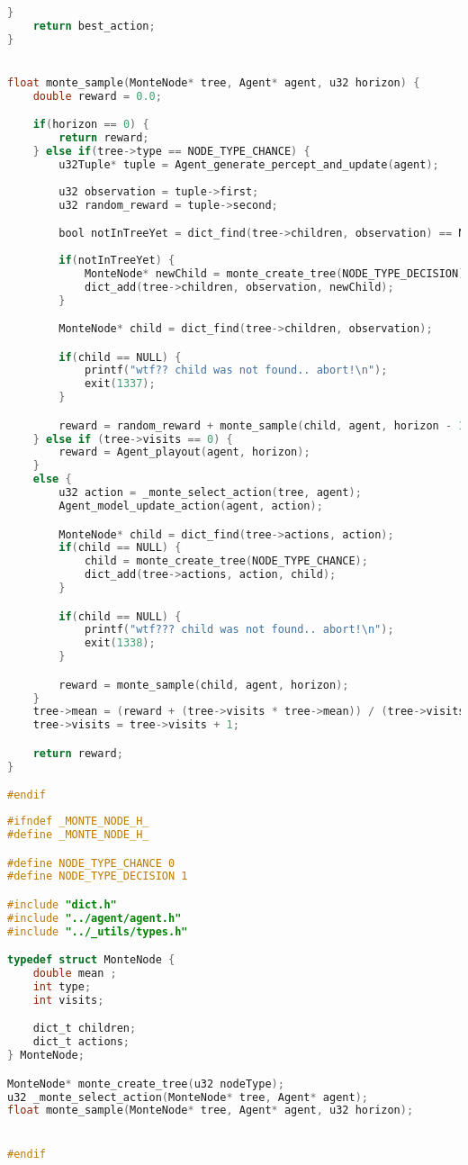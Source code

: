 \documentclass[fancychapters]{report}   	%
\begin{document}
\begin{lstlisting}[language=C,caption={search.c}]
    }
    return best_action;
}


float monte_sample(MonteNode* tree, Agent* agent, u32 horizon) {
    double reward = 0.0;

    if(horizon == 0) {
        return reward;
    } else if(tree->type == NODE_TYPE_CHANCE) {
        u32Tuple* tuple = Agent_generate_percept_and_update(agent);
	
        u32 observation = tuple->first;
        u32 random_reward = tuple->second;

        bool notInTreeYet = dict_find(tree->children, observation) == NULL;
	
        if(notInTreeYet) {
            MonteNode* newChild = monte_create_tree(NODE_TYPE_DECISION);
            dict_add(tree->children, observation, newChild);
        }

        MonteNode* child = dict_find(tree->children, observation);

        if(child == NULL) {
            printf("wtf?? child was not found.. abort!\n");
            exit(1337);
        }

        reward = random_reward + monte_sample(child, agent, horizon - 1);
    } else if (tree->visits == 0) {
        reward = Agent_playout(agent, horizon);
    }
    else {
        u32 action = _monte_select_action(tree, agent);
        Agent_model_update_action(agent, action);

        MonteNode* child = dict_find(tree->actions, action);
        if(child == NULL) {
            child = monte_create_tree(NODE_TYPE_CHANCE);
    	    dict_add(tree->actions, action, child);
        }

        if(child == NULL) {
            printf("wtf??? child was not found.. abort!\n");
            exit(1338);
        }

        reward = monte_sample(child, agent, horizon);
    }
    tree->mean = (reward + (tree->visits * tree->mean)) / (tree->visits + 1.0);
    tree->visits = tree->visits + 1;

    return reward;
}

#endif
\end{lstlisting}
\begin{lstlisting}[language=C,caption={monte_node.h}]
#ifndef _MONTE_NODE_H_
#define _MONTE_NODE_H_

#define NODE_TYPE_CHANCE 0
#define NODE_TYPE_DECISION 1

#include "dict.h"
#include "../agent/agent.h"
#include "../_utils/types.h"

typedef struct MonteNode {
    double mean ;
    int type;
    int visits;

    dict_t children;
    dict_t actions;
} MonteNode;

MonteNode* monte_create_tree(u32 nodeType);
u32 _monte_select_action(MonteNode* tree, Agent* agent);
float monte_sample(MonteNode* tree, Agent* agent, u32 horizon);


#endif
\end{lstlisting}
\end{document}
